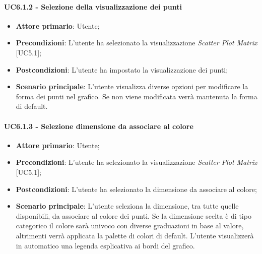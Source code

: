\paragraph{UC6.1.2 - Selezione della visualizzazione dei punti}
\begin{itemize}
	\item \textbf{Attore primario}: Utente;
	\item \textbf{Precondizioni}: L'utente ha selezionato la visualizzazione \textit{Scatter Plot Matrix} [UC5.1];
	\item \textbf{Postcondizioni}: L'utente ha impostato la visualizzazione dei punti;		
	\item \textbf{Scenario principale}: L'utente visualizza diverse opzioni per modificare la forma dei punti nel grafico. Se non viene modificata verrà mantenuta la forma di default.
\end{itemize}

\paragraph{UC6.1.3 - Selezione dimensione da associare al colore}
\begin{itemize}
	\item \textbf{Attore primario}: Utente;
	\item \textbf{Precondizioni}: L'utente ha selezionato la visualizzazione \textit{Scatter Plot Matrix} [UC5.1];
	\item \textbf{Postcondizioni}: L'utente ha selezionato la dimensione da associare al colore;
	
	\item \textbf{Scenario principale}: L'utente seleziona la dimensione, tra tutte quelle disponibili, da associare al colore dei punti. Se la dimensione scelta è di tipo categorico il colore sarà univoco con diverse graduazioni in base al valore, altrimenti verrà applicata la palette di colori di default. L'utente visualizzerà in automatico una legenda esplicativa ai bordi del grafico.
\end{itemize}